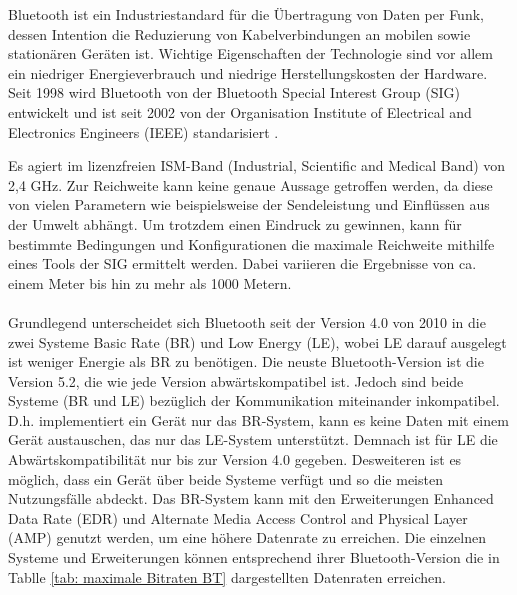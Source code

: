 Bluetooth ist ein Industriestandard für die Übertragung von Daten per Funk, dessen Intention die Reduzierung von Kabelverbindungen an mobilen sowie stationären Geräten ist. Wichtige Eigenschaften der Technologie sind vor allem ein niedriger Energieverbrauch und niedrige Herstellungskosten der Hardware. Seit 1998 wird Bluetooth von der Bluetooth Special Interest Group (SIG) entwickelt und ist seit 2002 von der Organisation Institute of Electrical and Electronics Engineers (IEEE) standarisiert \cite{IEEE}.

Es agiert im lizenzfreien ISM-Band (Industrial, Scientific and Medical Band) von 2,4 GHz. 
Zur Reichweite kann keine genaue Aussage getroffen werden, da diese von vielen Parametern wie beispielsweise der Sendeleistung und Einflüssen aus der Umwelt abhängt. Um trotzdem einen Eindruck zu gewinnen, kann für bestimmte Bedingungen und Konfigurationen die maximale Reichweite mithilfe eines Tools \cite{BtRangeTool} der SIG ermittelt werden. Dabei variieren die Ergebnisse von ca. einem Meter bis hin zu mehr als 1000 Metern.
\\\\
Grundlegend unterscheidet sich Bluetooth seit der Version 4.0 von 2010 in die zwei Systeme Basic Rate (BR) und Low Energy (LE), wobei LE darauf ausgelegt ist weniger Energie als BR zu benötigen. Die neuste Bluetooth-Version ist die Version 5.2, die wie jede Version abwärtskompatibel ist. Jedoch sind beide Systeme (BR und LE) bezüglich der Kommunikation miteinander inkompatibel. D.h. implementiert ein Gerät nur das BR-System, kann es keine Daten mit einem Gerät austauschen, das nur das LE-System unterstützt. Demnach ist für LE die Abwärtskompatibilität nur bis zur Version 4.0 gegeben. Desweiteren ist es möglich, dass ein Gerät über beide Systeme verfügt und so die meisten Nutzungsfälle abdeckt. Das BR-System kann mit den Erweiterungen Enhanced Data Rate (EDR) und Alternate Media Access Control and Physical Layer (AMP) genutzt werden, um eine höhere Datenrate zu erreichen. Die einzelnen Systeme und Erweiterungen können entsprechend ihrer Bluetooth-Version die in Tablle \ref{tab: maximale Bitraten BT} dargestellten Datenraten erreichen.\\

